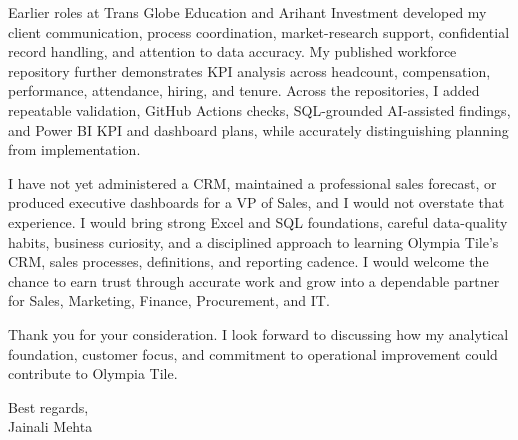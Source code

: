 \documentclass[letterpaper,11pt]{article}
\begin{document}
\bigbreak
Earlier roles at Trans Globe Education and Arihant Investment developed my client communication, process coordination, market-research support, confidential record handling, and attention to data accuracy. My published workforce repository further demonstrates KPI analysis across headcount, compensation, performance, attendance, hiring, and tenure. Across the repositories, I added repeatable validation, GitHub Actions checks, SQL-grounded AI-assisted findings, and Power BI KPI and dashboard plans, while accurately distinguishing planning from implementation.

\bigbreak
I have not yet administered a CRM, maintained a professional sales forecast, or produced executive dashboards for a VP of Sales, and I would not overstate that experience. I would bring strong Excel and SQL foundations, careful data-quality habits, business curiosity, and a disciplined approach to learning Olympia Tile's CRM, sales processes, definitions, and reporting cadence. I would welcome the chance to earn trust through accurate work and grow into a dependable partner for Sales, Marketing, Finance, Procurement, and IT.

\bigbreak
Thank you for your consideration. I look forward to discussing how my analytical foundation, customer focus, and commitment to operational improvement could contribute to Olympia Tile.

\bigbreak
Best regards,\\
Jainali Mehta
\end{document}
